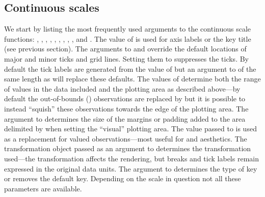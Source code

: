 \documentclass[krantz2]{krantz}\usepackage{knitr}
\begin{document}
%
%

\subsection{Continuous scales}\label{sec:plot:scales:continuous}
We start by listing the most frequently used arguments to the continuous scale functions: , , , , , , , , , and . The value of  is used for axis labels or the key title (see previous section). The arguments to  and  override the default locations of major and minor ticks and grid lines. Setting them to  suppresses the ticks. By default the tick labels are generated from the value of  but an argument to  of the same length as  will replace these defaults. The values of  determine both the range of values in the data included and the plotting area as described above---by default the out-of-bounds () observations are replaced by  but it is possible to instead ``squish'' these observations towards the edge of the plotting area. The argument to  determines the size of the margins or padding added to the area delimited by  when setting the ``visual'' plotting area. The value passed to  is used as a replacement for  valued observations---most useful for  and  aesthetics. The transformation object passed as an argument to  determines the transformation used---the transformation affects the rendering, but breaks and tick labels remain expressed in the original data units. The argument to  determines the type of key or removes the default key. Depending on the scale in question not all these parameters are available.
\end{document}
